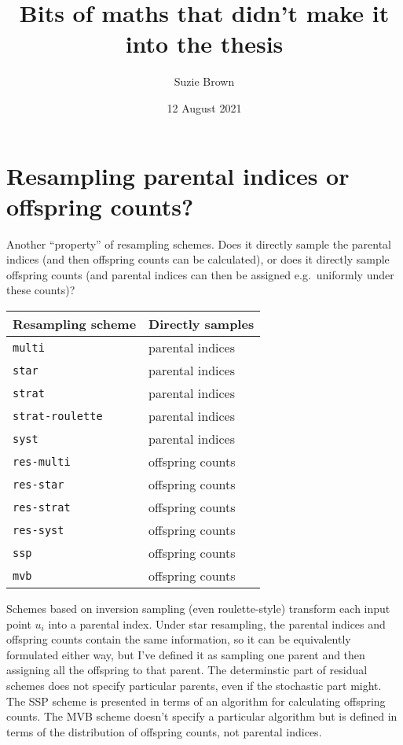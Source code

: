 \documentclass[fleqn]{article}
\title{Bits of maths that didn't make it into the thesis}
\author{Suzie Brown}
\date{12 August 2021}
\newcommand{\1}[1]{\mathbb{I}_{#1}}
\begin{document}
\maketitle
\thispagestyle{fancy}


\section{Resampling parental indices or offspring counts?}
Another ``property'' of resampling schemes. Does it directly sample the parental indices (and then offspring counts can be calculated), or does it directly sample offspring counts (and parental indices can then be assigned e.g.\ uniformly under these counts)?

\vspace*{7pt}
\begin{tabular}{l l}
Resampling scheme & Directly samples \\
\hline
\texttt{multi} & parental indices \\
\texttt{star} & parental indices \\
\texttt{strat} & parental indices \\
\texttt{strat-roulette} & parental indices \\
\texttt{syst} & parental indices \\
\texttt{res-multi} & offspring counts \\
\texttt{res-star} & offspring counts \\
\texttt{res-strat} & offspring counts \\
\texttt{res-syst} & offspring counts \\
\texttt{ssp} & offspring counts \\
\texttt{mvb} & offspring counts \\
\end{tabular}
\vspace*{7pt}

Schemes based on inversion sampling (even roulette-style) transform each input point $u_i$ into a parental index. 
Under star resampling, the parental indices and offspring counts contain the same information, so it can be equivalently formulated either way, but I've defined it as sampling one parent and then assigning all the offspring to that parent.
The determinstic part of residual schemes does not specify particular parents, even if the stochastic part might.
The SSP scheme is presented in terms of an algorithm for calculating offspring counts. 
The MVB scheme doesn't specify a particular algorithm but is defined in terms of the distribution of offspring counts, not parental indices.
\end{document}
